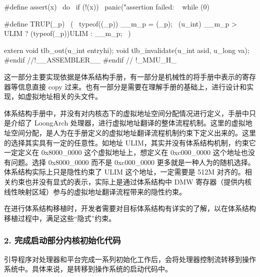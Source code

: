 \begin{CodeBlock}[language=BookC]
#define assert(x)                                                                                  \
    do {                                                                                       \
        if (!(x)) {                                                                        \
            panic("assertion failed: %
        }                                                                                  \
    } while (0)

#define TRUP(_p)                                                                                   \
    ({                                                                                         \
        typeof((_p)) __m_p = (_p);                                                         \
        (u_int) __m_p > ULIM ? (typeof(_p))ULIM : __m_p;                                   \
    })

extern void tlb_out(u_int entryhi);
void tlb_invalidate(u_int asid, u_long va);
#endif //!__ASSEMBLER__
#endif // !_MMU_H_

\end{CodeBlock}

这一部分主要实现依据是体系结构手册，有一部分是机械性的将手册中表示的寄存器等信息直接 copy 过来。也有一部分是需要在理解手册的基础上，进行设计和实现，如虚拟地址相关的头文件。

体系结构手册中，并没有对内核态下的虚拟地址空间分配情况进行定义，手册中只是介绍了 LoongArch 处理器，进行虚拟地址翻译的整体流程机制。这里的虚拟地址空间分配，是人为在手册定义的虚拟地址翻译流程机制约束下定义出来的。这里的选择其实具有一定的任意性。如地址 ULIM，其实并没有体系结构机制，约束它一定定义在 0x8000\_0000 这个虚拟地址上，想定义在 0xc000\_0000 这个地址也没有问题。选择 0x8000\_0000 而不是 0xc000\_0000 更多就是一种人为的随机选择。体系结构实际上只是隐性约束了 ULIM 这个地址，一定需要是 512M 对齐的。相关约束也并没有显式的表示，实际上是通过体系结构中 DMW 寄存器（提供内核线性映射区域）参与的虚拟地址翻译流程带来的隐性约束。

在进行体系结构移植时，开发者需要对目标体系结构有详实的了解，以在体系结构移植过程中，满足这些``隐式''约束。

\subsubsection{2. 完成启动部分内核初始化代码}\label{sec:13-operating-system-004}

引导程序对处理器和平台完成一系列初始化工作后，会将处理器控制流转移到操作系统中。具体来说，是转移到操作系统的启动代码中。

